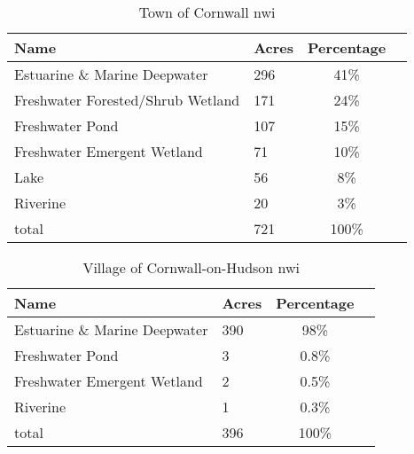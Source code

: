 \begin{table}[h!]
    \begin{centering}
    \begin{tabular}{l l c c }
    Name & Acres & Percentage \\
    \hline
    Estuarine \& Marine Deepwater & 296 & 41\%  &\\
    Freshwater Forested/Shrub Wetland & 171  & 24\%  &\\
    Freshwater Pond & 107 & 15\% &\\
    Freshwater Emergent Wetland & 71 & 10\% & \\
   	Lake & 56 & 8\% &\\ 
    Riverine & 20 & 3\% &\\
    total & 721 & 100\% &\\
    \end{tabular}
    \caption{Town of Cornwall \gls{nwi}}
    \label{tab:cornwall_nwi}
    \end{centering}
\end{table}

\begin{table}[h!]
    \begin{centering}
    \begin{tabular}{l l c c }
    Name & Acres & Percentage \\
    \hline
    Estuarine \& Marine Deepwater & 390 & 98\%  &\\
    Freshwater Pond & 3 & 0.8\% &\\
    Freshwater Emergent Wetland & 2 & 0.5\% & \\
    Riverine & 1 & 0.3\% &\\
    total & 396 & 100\% &\\
    \end{tabular}
    \end{centering} 
    \caption{Village of Cornwall-on-Hudson \gls{nwi}}
    \label{tab:coh_nwi}
\end{table}